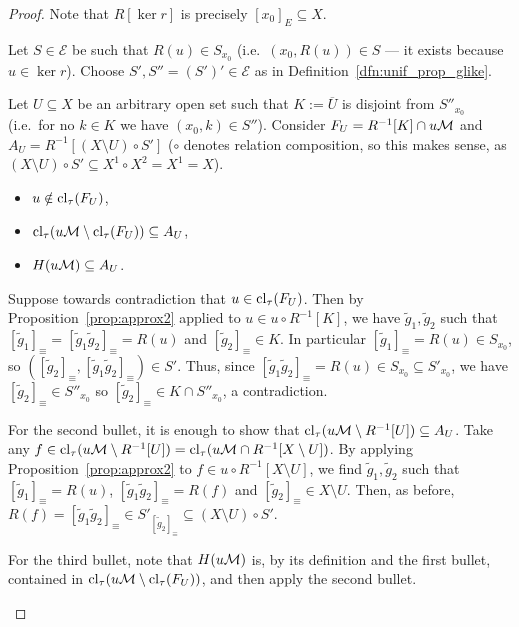 	\begin{proof}
		Note that $R[\ker r]$ is precisely $[x_0]_E\subseteq X$.
		
		Let $S\in \mathcal E$ be such that $R(u)\in S_{x_0}$ (i.e.\ $(x_0,R(u))\in S$ --- it exists because $u\in \ker r$). Choose $S',S''=(S')'\in \mathcal E$ as in Definition~\ref{dfn:unif_prop_glike}.
		
		Let $U\subseteq X$ be an arbitrary open set such that $K:=\overline U$ is disjoint from $S''_{x_0}$ (i.e.\ for no $k\in K$ we have $(x_0,k)\in S''$). Consider $F_U=R^{-1}[K]\cap u{\mathcal M}$ and $A_U=R^{-1}[(X\setminus U)\circ S']$ ($\circ$ denotes relation composition, so this makes sense, as $(X\setminus U)\circ S'\subseteq X^1\circ X^2=X^1=X$).
		
		\begin{clm*}\begin{itemize}
				\item $u\notin \operatorname{{cl}}_\tau(F_U)$,
				\item $\operatorname{{cl}}_\tau(u{\mathcal M}\setminus \operatorname{{cl}}_\tau(F_U))\subseteq A_U$,
				\item $H(u{\mathcal M})\subseteq A_U$.
			\end{itemize}
		\end{clm*}
		\begin{clmproof}
			Suppose towards contradiction that $u\in \operatorname{{cl}}_\tau(F_U)$. Then by Proposition~\ref{prop:approx2} applied to $u\in u\circ R^{-1}[K]$, we have $\tilde g_1,\tilde g_2$ such that $[\tilde g_1]_\equiv=[\tilde g_1\tilde g_2]_\equiv=R(u)$ and $[\tilde g_2]_\equiv\in K$. In particular $[\tilde g_1]_\equiv= R(u)\in S_{x_0}$, so $([\tilde g_2]_\equiv,[\tilde g_1\tilde g_2]_\equiv)\in S'$. Thus, since $[\tilde g_1\tilde g_2]_\equiv=R(u)\in S_{x_0}\subseteq S'_{x_0}$, we have $[\tilde g_2]_\equiv\in S''_{x_0}$ so $[\tilde g_2]_\equiv \in K\cap S''_{x_0}$, a contradiction.
			
			For the second bullet, it is enough to show that $\operatorname{{cl}}_\tau(u{\mathcal M}\setminus R^{-1}[U])\subseteq A_U$. Take any $f\in \operatorname{{cl}}_\tau(u{\mathcal M}\setminus R^{-1}[U])=\operatorname{{cl}}_\tau(u{\mathcal M}\cap R^{-1}[X\setminus U])$. By applying Proposition~\ref{prop:approx2} to $f\in u\circ R^{-1}[X\setminus U]$, we find $\tilde g_1,\tilde g_2$ such that $[\tilde g_1]_\equiv=R(u)$, $[\tilde g_1\tilde g_2]_\equiv=R(f)$ and $[\tilde g_2]_\equiv\in X\setminus U$. Then, as before, $R(f)=[\tilde g_1\tilde g_2]_\equiv\in S'_{[\tilde g_2]_\equiv}\subseteq (X\setminus U)\circ S'$.
			
			For the third bullet, note that $H(u{\mathcal M})$ is, by its definition and the first bullet, contained in $\operatorname{{cl}}_\tau(u{\mathcal M}\setminus \operatorname{{cl}}_\tau(F_U))$, and then apply the second bullet.
		\end{clmproof}
		

\end{proof}
